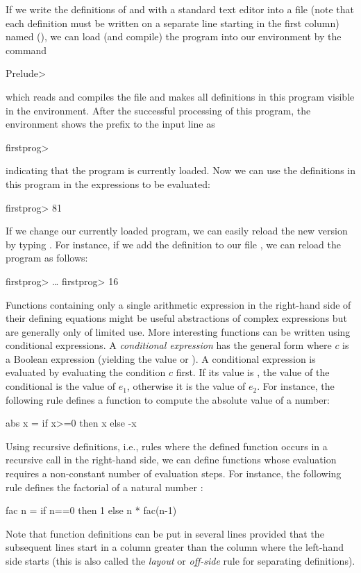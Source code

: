 If we write the definitions of  and 
with a standard text editor
into a file (note that each definition must be written on a separate
line starting in the first column) named 
(),
we can load (and compile) the program into our environment
by the command
\begin{prog}
Prelude> 
\end{prog}
which reads and compiles the file  and
makes all definitions in this program visible in the environment.
After the successful processing of this program, the environment
shows the prefix to the input line as
\begin{prog}
firstprog>
\end{prog}
indicating that the program  is currently loaded.
Now we can use the definitions in this program in the expressions
to be evaluated:
\begin{prog}
firstprog> 
81
\end{prog}
If we change our currently loaded program, we can easily reload
the new version by typing . For instance,
if we add the definition  to our file
, we can reload the program as follows:
\begin{prog}
firstprog> 
\ldots
firstprog> 
16
\end{prog}
Functions containing only a single arithmetic expression in the
right-hand side of their defining equations might be useful abstractions
of complex expressions but are generally only of limited use.
More interesting functions can be written using conditional
expressions. A \emph{conditional expression}%
has the general form 
where $c$ is a Boolean expression (yielding the value 
or ). A conditional expression is evaluated by
evaluating the condition $c$ first. If its value is ,
the value of the conditional is the value of $e_1$, otherwise
it is the value of $e_2$. For instance, the following rule
defines a function to compute the absolute value of a number:
\begin{prog}
abs x = if x>=0 then x else -x
\end{prog}
Using recursive definitions, i.e., rules where the defined
function occurs in a recursive call in the right-hand side,
we can define functions whose evaluation requires a non-constant
number of evaluation steps. For instance, the following rule
defines the factorial of a natural number
:
\begin{prog}
fac n = if n==0 then 1
                else n * fac(n-1)
\end{prog}
Note that function definitions can be put in several lines
provided that the subsequent lines start in a column greater
than the column where the left-hand side starts
(this is also called the \emph{layout}
or \emph{off-side} rule for separating
definitions).

